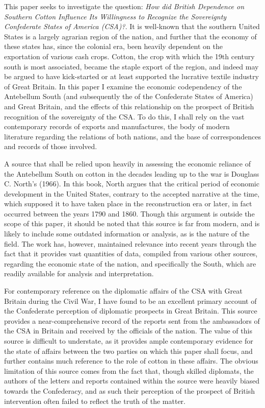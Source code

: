 
This paper seeks to investigate the question: \flq{}\emph{How did British Dependence on Southern Cotton Influence Its Willingness to Recognize the Sovereignty Confederate 
States of America (CSA)?}\frq{}. It is well-known that the southern United States is a largely agrarian region of the nation, and further that
the economy of these states has, since the colonial era, been heavily dependent on the exportation of various \flq{}cash crops\frq{}. Cotton, the crop with which
the 19th century south is most associated, became the staple export of the region, and indeed may be argued to have kick-started or at least supported the
lucrative textile industry of Great Britain. In this paper I examine the economic codependency of the Antebellum South (and subsequently the of the
Confederate States of America) and Great Britain, and the effects of this relationship on the prospect of British
recognition of the sovereignty of the CSA. To do this, I shall rely on the vast contemporary records of exports and manufactures, the body of modern 
literature regarding the relations of both nations, and the base of correspondences and records of those involved.

A source that shall be relied upon heavily in assessing the economic reliance of the Antebellum South on cotton in the decades leading up to the war is
Douglass C. North's  (1966). In this book, North argues that the critical period of economic development in the United States,
contrary to the accepted narrative at the time, which supposed it to have taken place in the reconstruction era or later, in fact occurred between the
years 1790 and 1860. Though this argument is outside the scope of this paper, it should be noted that this source is far from modern, and is likely
to include some outdated information or analysis, as is the nature of the field. The work has, however, maintained relevance into recent years
through the fact that it provides vast quantities of data, compiled from various other sources, regarding the economic state of the nation, and specifically
the South, which are readily available for analysis and interpretation.

For contemporary reference on the diplomatic affairs of the CSA with Great Britain during the Civil War, I have found 
to be an excellent primary account of the Confederate perception of diplomatic prospects in Great Britain. This source provides a near-comprehensive
record of the reports sent from the ambassadors of the CSA in Britain and received by the officials of the nation. The value of this source is difficult
to understate, as it provides ample contemporary evidence for the state of affairs between the two parties on which this paper shall focus, and further
contains much reference to the role of cotton in these affairs. The obvious limitation of this source comes from the fact that, though skilled diplomats,
the authors of the letters and reports contained within the source were heavily biased towards the Confederacy, and as such their perception of the
prospect of British intervention often failed to reflect the truth of the matter.
